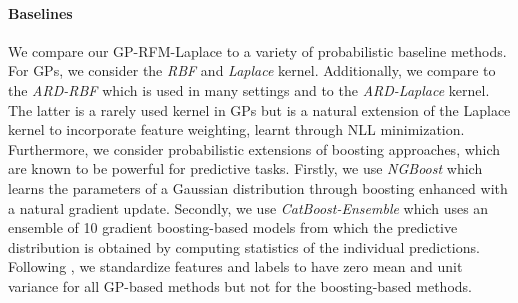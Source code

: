 \paragraph{Baselines}
We compare our GP-RFM-Laplace to a variety of probabilistic baseline methods.
For GPs, we consider the \emph{RBF} and \emph{Laplace} kernel.
Additionally, we compare to the \emph{ARD-RBF} \citep{neal1996bayesian} which is used in many settings and to the \emph{ARD-Laplace} kernel.
The latter is a rarely used kernel in GPs but is a natural extension of the Laplace kernel to incorporate feature weighting, learnt through NLL minimization.
Furthermore, we consider probabilistic extensions of boosting approaches, which are known to be powerful for predictive tasks.
Firstly, we use \emph{NGBoost} \citep{duan2020ngboost} which learns the parameters of a Gaussian distribution through boosting enhanced with a natural gradient update.
Secondly, we use \emph{CatBoost-Ensemble} \citep{prokhorenkova2018catboost} which uses an ensemble of 10 gradient boosting-based models from which the predictive distribution is obtained by computing statistics of the individual predictions.
Following \citet{duan2020ngboost}, we standardize features and labels to have zero mean and unit variance for all GP-based methods but not for the boosting-based methods.



